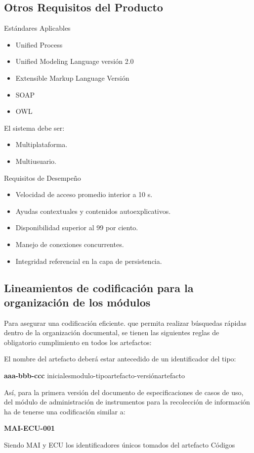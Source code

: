 \subsection{Otros Requisitos del Producto}

Estándares Aplicables

\begin{itemize}
\item Unified Process
\item Unified Modeling Language versión 2.0
\item Extensible Markup Language Versión
\item SOAP
\item OWL
\end{itemize}


El sistema debe ser:

\begin{itemize}
\item Multiplataforma.
\item Multiusuario.             
\end{itemize}

Requisitos de Desempeño

\begin{itemize}
\item Velocidad de acceso promedio interior a 10 s.
\item Ayudas contextuales y contenidos autoexplicativos.
\item Disponibilidad superior al 99 por ciento.
\item Manejo de conexiones concurrentes.
\item Integridad referencial en la capa de persistencia.
\end{itemize}

\subsection{Lineamientos de codificación para la organización de los módulos}

Para asegurar una codificación eficiente. que permita realizar búsquedas rápidas dentro de la organización documental, se tienen las siguientes reglas de obligatorio cumplimiento en todos los artefactos:

El nombre del artefacto deberá estar antecedido de un identificador del tipo:

\begin{center}
\textbf{aaa-bbb-ccc}
inicialesmodulo-tipoartefacto-versiónartefacto
\end{center}

Así, para la primera versión del documento de especificaciones de casos de uso, del módulo de administración de instrumentos para la recolección de información ha de tenerse una codificación similar a:

\begin{center}
\textbf{MAI-ECU-001}
\end{center}

Siendo MAI y ECU los identificadores únicos tomados del artefacto Códigos